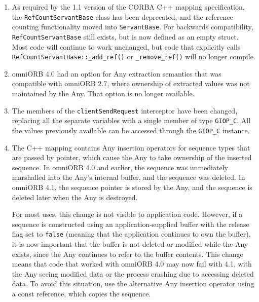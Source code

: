 \documentclass[11pt,twoside,a4paper]{book}
\newcommand{\type}[1]{\texttt{#1}}
\newcommand{\code}[1]{\texttt{#1}}
\newcommand{\op}[1]{\texttt{#1()}}
\begin{document}
\begin{enumerate}

\item As required by the 1.1 version of the CORBA C++ mapping
  specification, the \type{RefCountServantBase} class has been
  deprecated, and the reference counting functionality moved into
  \type{ServantBase}. For backwards compatibility,
  \type{RefCountServantBase} still exists, but is now defined as an
  empty struct. Most code will continue to work unchanged, but code
  that explicitly calls \op{RefCountServantBase::\_add\_ref} or
  \op{\_remove\_ref} will no longer compile.

\item omniORB 4.0 had an option for Any extraction semantics that was
  compatible with omniORB 2.7, where ownership of extracted values was
  not maintained by the Any. That option is no longer available.

\item The members of the \code{clientSendRequest} interceptor have
  been changed, replacing all the separate variables with a single
  member of type \code{GIOP\_C}. All the values previously available
  can be accessed through the \code{GIOP\_C} instance.

\item The C++ mapping contains Any insertion operators for sequence
  types that are passed by pointer, which cause the Any to take
  ownership of the inserted sequence. In omniORB 4.0 and earlier, the
  sequence was immediately marshalled into the Any's internal buffer,
  and the sequence was deleted. In omniORB 4.1, the sequence pointer
  is stored by the Any, and the sequence is deleted later when the Any
  is destroyed.

  For most uses, this change is not visible to application code.
  However, if a sequence is constructed using an application-supplied
  buffer with the release flag set to \code{false} (meaning that the
  application continues to own the buffer), it is now important that
  the buffer is not deleted or modified while the Any exists, since
  the Any continues to refer to the buffer contents.  This change
  means that code that worked with omniORB 4.0 may now fail with 4.1,
  with the Any seeing modified data or the process crashing due to
  accessing deleted data. To avoid this situation, use the alternative
  Any insertion operator using a const reference, which copies the
  sequence.

\end{enumerate}
\end{document}
